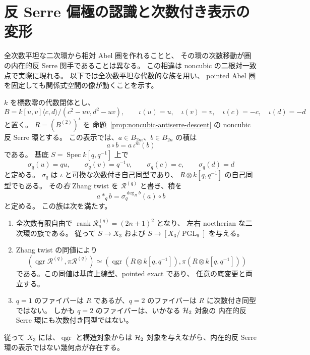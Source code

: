 \section{反 Serre 偏極の認識と次数付き表示の変形}
\label{sec:antiserre-polarization}

全次数平坦な二次環から相対 Abel 圏を作れることと、
その環の次数移動が圏の内在的反 Serre 関手であることは異なる。
この相違は noncubic の二根対一致点で実際に現れる。
以下では全次数平坦な代数的な族を用い、
pointed Abel 圏を固定しても関係式空間の像が動くことを示す。

\begin{proposition}
\label{prop:antiserre-polarization-family}
$k$ を標数零の代数閉体とし、
\[
 B=k[u,v]\langle c,d\rangle/(c^2-uv,d^2-uv),\qquad
 \iota(u)=u,\quad\iota(v)=v,\quad\iota(c)=-c,\quad\iota(d)=-d
\]
と置く。
$R=(B^{(2)})^{\iota}$ を
命題~\ref{prop:noncubic-antiserre-descent} の noncubic 反 Serre 環とする。
この表示では、$a\in B_{2m}$、$b\in B_{2n}$ の積は
\[
 a\mathbin{\circ} b=a\,\iota^m(b)
\]
である。
基底 $S=\operatorname{Spec}k[q,q^{-1}]$ 上で
\[
 \sigma_q(u)=qu,\qquad \sigma_q(v)=q^{-1}v,\qquad
 \sigma_q(c)=c,\qquad \sigma_q(d)=d
\]
と定める。
$\sigma_q$ は $\iota$ と可換な次数付き自己同型であり、
$R\otimes k[q,q^{-1}]$ の自己同型でもある。
その\emph{右} Zhang twist を $\mathcal R^{(q)}$ と書き、積を
\[
 a*_q b=\sigma_q^{\deg_R b}(a)\mathbin{\circ}b
 \tag{ZT}\label{eq:polarization-right-zhang}
\]
と定める。
この族は次を満たす。
\begin{enumerate}
\item 全次数有限自由で
$\operatorname{rank}\mathcal R^{(q)}_n=(2n+1)^2$ となり、
左右 noetherian な二次環の族である。
従って $S\to X_3$ および
$S\to[X_3/\operatorname{PGL}_9]$ を与える。
\item Zhang twist の同値により
\[
 (\operatorname{qgr}\mathcal R^{(q)},\pi\mathcal R^{(q)})
 \simeq
 (\operatorname{qgr}(R\otimes k[q,q^{-1}]),\pi(R\otimes k[q,q^{-1}]))
\]
である。この同値は基底上線型、pointed exact であり、
任意の底変更と両立する。
\item $q=1$ のファイバーは $R$ であるが、$q=2$ のファイバーは
$R$ に次数付き同型ではない。
しかも $q=2$ のファイバーは、いかなる $\mathcal H_2$ 対象の
内在的反 Serre 環にも次数付き同型ではない。
\end{enumerate}
従って $X_3$ には、$\operatorname{qgr}$ と構造対象からは
$\mathcal H_2$ 対象を与えながら、内在的反 Serre 環の表示ではない幾何点が存在する。
\end{proposition}
